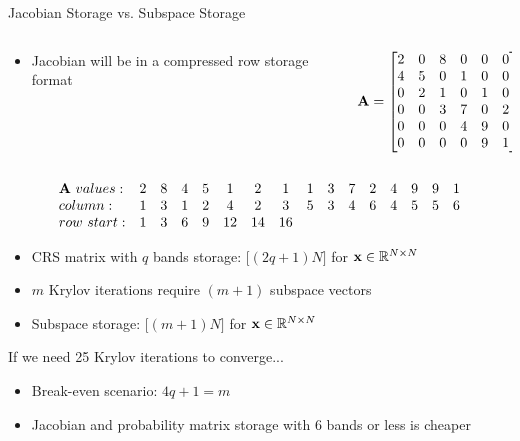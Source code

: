 \documentclass{beamer}
\begin{document}
\begin{frame}{Jacobian Storage vs. Subspace Storage}

  \begin{columns}

    \begin{column}{0.5\textwidth}
      \begin{itemize}
      \item Jacobian will be in a compressed row storage format
      \end{itemize}
    \end{column}

    \begin{column}{0.5\textwidth}
      \small{\[ \mathbf{A} =
        \begin{bmatrix}
          2 & 0 & 8 & 0 & 0 & 0 \\ 4 & 5 & 0 & 1 & 0 & 0 \\ 0 & 2 & 1
          & 0 & 1 & 0 \\ 0 & 0 & 3 & 7 & 0 & 2 \\ 0 & 0 & 0 & 4 & 9 &
          0 \\ 0 & 0 & 0 & 0 & 9 & 1 \\
        \end{bmatrix}      
        \]}
    \end{column}

  \end{columns}

  \small{ \[
    \begin{array}{lccccccccccccccc}
      \mathbf{A}\ values: & 2 & 8 & 4 & 5 & 1 & 2 & 1 & 1 & 3 & 7 & 2 & 4
      & 9 & 9 & 1 \\ column: & 1 & 3 & 1 & 2 & 4 & 2 & 3 & 5 & 3 & 4 &
      6 & 4 & 5 & 5 & 6 \\ row\ start: & 1 & 3 & 6 & 9 & 12 & 14 & 16
      \\
    \end{array}
    \]}

  \begin{itemize}
  \item CRS matrix with $q$ bands storage: $\big[(2q+1)N\big]$ for $\mathbf{x} \in
    \mathbb{R}^{N \times N}$ 
    \pause
  \item $m$ Krylov iterations require $(m+1)$ subspace vectors
  \item Subspace storage: $\big[(m+1) N\big]$ for $\mathbf{x} \in
    \mathbb{R}^{N \times N}$
  \end{itemize}

  \pause 
  \begin{beamerboxesrounded}[upper=boxheadcolor,lower=boxbodycolor,shadow=true]
    {If we need 25 Krylov iterations to converge...}
    \begin{itemize}
    \item Break-even scenario: $4q+1 = m$
    \item Jacobian and probability matrix storage with 6 bands or less
      is cheaper
    \end{itemize}
  \end{beamerboxesrounded}

\end{frame}
\end{document}
